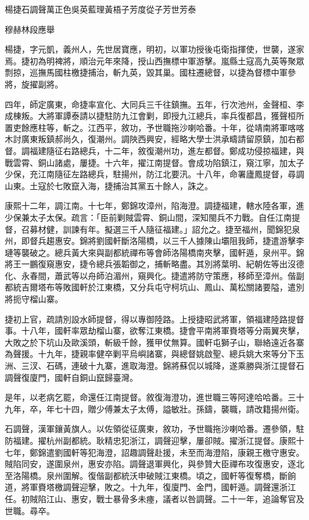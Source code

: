 
\begin{pinyinscope}
楊捷石調聲萬正色吳英藍理黃梧子芳度從子芳世芳泰

穆赫林段應舉

楊捷，字元凱，義州人，先世居寶應，明初，以軍功授後屯衛指揮使，世襲，遂家焉。捷初為明裨將，順治元年來降，授山西撫標中軍游擊。嵐縣土寇高九英等聚眾剽掠，巡撫馬國柱檄捷捕治，斬九英，毀其巢。國柱遷總督，以捷為督標中軍參將，旋擢副將。

四年，師定廣東，命捷率宣化、大同兵三千往鎮撫。五年，行次池州，金聲桓、李成棟叛。大將軍譚泰請以捷駐防九江會剿，即授九江總兵，率兵復都昌，獲聲桓所置吏餘應柱等，斬之。江西平，敘功，予世職拖沙喇哈番。十年，從靖南將軍喀喀木討廣東叛鎮郝尚久，復潮州。調陜西興安，經略大學士洪承疇請留原鎮，加右都督。調福建隨征右路總兵，十二年，敘復潮州功，進左都督。鄭成功侵掠福建，與戰雲霄、銅山諸處，屢捷。十六年，擢江南提督。會成功陷鎮江，窺江寧，加太子少保，充江南隨征左路總兵，駐揚州，防江北要汛。十八年，命署廬鳳提督，尋調山東。土寇於七敗竄入海，捷捕治其黨五十餘人，誅之。

康熙十二年，調江南。十七年，鄭錦攻漳州，陷海澄。調捷福建，轄水陸各軍，進少保兼太子太保。疏言：「臣前剿賊雲霄、銅山間，深知閩兵不力戰。自任江南提督，召募材健，訓諫有年。擬選三千人隨征福建。」詔允之。捷至福州，聞錦犯泉州，即督兵趨惠安。錦將劉國軒斷洛陽橋，以三千人據陳山壩阻我師，捷遣游擊李璉等襲破之。總兵黃大來與副都統禪布等會師洛陽橋南夾擊，國軒遁，泉州平。錦將王一鵬復窺惠安，捷令總兵張韜御之，捕斬略盡。其別將葉明、紀朝佐等出沒德化、永春間，蕭武等以舟師泊湄州，窺興化。捷遣將防守策應，移師至漳州。偕副都統吉爾塔布等敗國軒於江東橋，又分兵屯守柯坑山、鳳山、萬松關諸要隘，遣別將扼守榴山寨。

捷初上官，疏請別設水師提督，得以專御陸路。上授捷昭武將軍，領福建陸路提督事。十八年，國軒率眾劫榴山寨，欲奪江東橋。捷會平南將軍賚塔等分兩翼夾擊，大敗之於下坑山及歐溪頭，斬級千餘，獲甲仗無算。國軒屯獅子山，聯絡遠近各寨為聲援。十九年，捷親率健卒剿平烏嶼諸寨，與總督姚啟聖、總兵姚大來等分下玉洲、三汊、石碼，連破十九寨，進取海澄。錦將蘇侃以城降，遂乘勝與浙江提督石調聲復廈門，國軒自銅山竄歸臺灣。

是年，以老病乞罷，命還任江南提督。敘復海澄功，進世職三等阿達哈哈番。三十九年，卒，年七十四，贈少傅兼太子太傅，謚敏壯。孫鑄，襲職，請改籍揚州衛。

石調聲，漢軍鑲黃旗人。以佐領從征廣東，敘功，予世職拖沙喇哈番。遷參領，駐防福建。擢杭州副都統。耿精忠犯浙江，調聲迎擊，屢卻賊。擢浙江提督。康熙十七年，鄭錦遣劉國軒等犯海澄，詔趣調聲赴援，未至而海澄陷，康親王檄守惠安。賊陷同安，遂圍泉州，惠安亦陷。調聲退軍興化，與參贊大臣禪布攻復惠安，逐北至洛陽橋。泉州圍解。復偕副都統沃申破賊江東橋。頃之，國軒等復奪橋，斷餉道，將軍賚塔檄調聲迎擊，敗之。十九年，復廈門、金門，國軒遁。調聲還浙江任。初賊陷江山、惠安，戰士暴骨多未瘞，議者以咎調聲。二十一年，追論奪官及世職。尋卒。


\end{pinyinscope}
